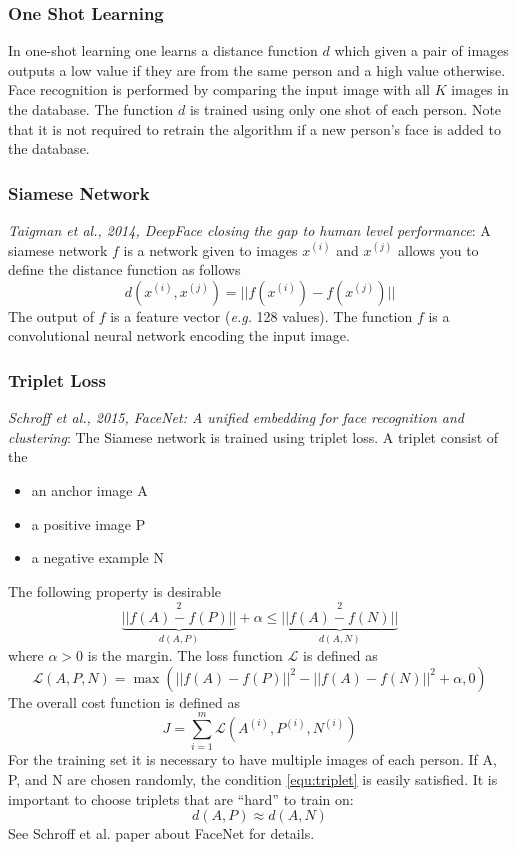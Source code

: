 \documentclass{article}
\begin{document}
\subsubsection{One Shot Learning}
In one-shot learning one learns a distance function $d$
which given a pair of images outputs a low value if they are from the same person and a high value otherwise.
Face recognition is performed by comparing the input image with all $K$ images in the database.
The function $d$ is trained using only one shot of each person.
Note that it is not required to retrain the algorithm if a new person's face is added to the database.

\subsubsection{Siamese Network}\label{cha:siamese}
\emph{Taigman et al., 2014, DeepFace closing the gap to human level performance}:
A siamese network $f$ is a network given to images $x^{(i)}$ and $x^{(j)}$ allows you to define the distance function as follows
\begin{equation}
  d(x^{(i)},x^{(j)}) = ||f(x^{(i)})-f(x^{(j)})||
\end{equation}
The output of $f$ is a feature vector (\emph{e.g.} 128 values).
The function $f$ is a convolutional neural network encoding the input image.

\subsubsection{Triplet Loss}
\emph{Schroff et al., 2015, FaceNet: A unified embedding for face recognition and clustering}:
The Siamese network is trained using triplet loss.
A triplet consist of the
\begin{itemize}
  \item an anchor image A
  \item a positive image P
  \item a negative example N
\end{itemize}
The following property is desirable
\begin{equation}\label{equ:triplet}
  \underbrace{||f(A)-f(P)||}_{d(A,P)}^2 + \alpha \le \underbrace{||f(A)-f(N)||}_{d(A,N)}^2
\end{equation}
where $\alpha>0$ is the margin.
The loss function $\mathcal{L}$ is defined as
\begin{equation}
  \mathcal{L}(A,P,N)=\max(||f(A)-f(P)||^2-||f(A)-f(N)||^2+\alpha, 0)
\end{equation}
The overall cost function is defined as
\begin{equation}
  J=\sum_{i=1}^m\mathcal{L}(A^{(i)},P^{(i)},N^{(i)})
\end{equation}
For the training set it is necessary to have multiple images of each person.
If A, P, and N are chosen randomly, the condition \cref{equ:triplet} is easily satisfied.
It is important to choose triplets that are ``hard'' to train on:
\begin{equation}
  d(A, P)\approx d(A, N)
\end{equation}
See Schroff et al. paper about FaceNet for details.
\end{document}
